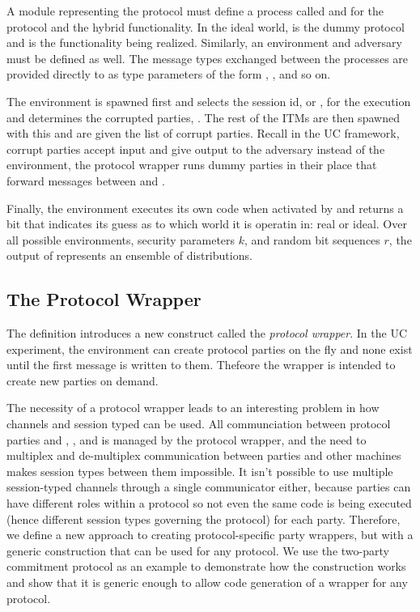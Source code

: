A module representing the protocol must define a process called  and  for the protocol and the hybrid functionality. 
In the ideal world,  is the dummy protocol and  is the functionality being realized.
Similarly, an environment  and adversary  must be defined as well.
The message types exchanged between the processes are provided directly to  as type parameters of the form , , and so on. 

The environment is spawned first and selects the session id, or , for the execution and determines the corrupted parties, .
The rest of the ITMs are then spawned with this  and are given the list of corrupt parties.
Recall in the UC framework, corrupt parties accept input and give output to the adversary instead of the environment, the protocol wrapper runs dummy parties in their place that forward messages between \Adversary and \F.

Finally, the environment executes its own code when activated by  and returns a bit that indicates its guess as to which world it is operatin in: real or ideal.
Over all possible environments, security parameters $k$, and random bit sequences $r$, the output of  represents an ensemble of distributions. 



\subsection{The Protocol Wrapper}
The  definition introduces a new construct called the \textit{protocol wrapper}. 
In the UC experiment, the environment can create protocol parties on the fly and none exist until the first message is written to them.
Thefeore the wrapper is intended to create new parties on demand.

The necessity of a protocol wrapper leads to an interesting problem in how channels and session typed can be used.
All communciation between protocol parties and \Environment, \F, and \Adversary is managed by the protocol wrapper, and the need to multiplex and de-multiplex communication between parties and other machines makes session types between them impossible.
It isn't possible to use multiple session-typed channels through a single communicator either, because parties can have different roles within a protocol so not even the same code is being executed (hence different session types governing the protocol) for each party.
Therefore, we define a new approach to creating protocol-specific party wrappers, but with a generic construction that can be used for any protocol.
We use the two-party commitment protocol as an example to demonstrate how the construction works and show that it is generic enough to allow code generation of a wrapper for any protocol.


